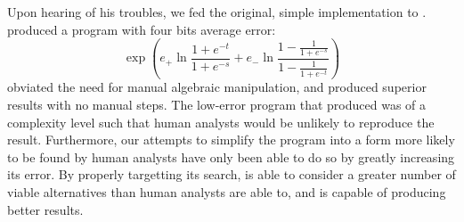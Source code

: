 \documentclass[paper.tex]{subfiles}
\begin{document}
Upon hearing of his troubles, we fed the original, simple
implementation to \casio.  \casio produced a program with four bits
average error:
\begin{equation*}
  \operatorname{exp}\left(e_+\ln{\frac{1+e^{-t}}{1+e^{-s}}} +
     e_-\ln{\frac{1-\frac{1}{1+e^{-s}}}
                 {1-\frac{1}{1+e^{-t}}}}\right)
\end{equation*}
\casio obviated the need for manual algebraic manipulation, and
produced superior results with no manual steps.  The low-error program
that \casio produced was of a complexity level such that human
analysts would be unlikely to reproduce the result.  Furthermore, our
attempts to simplify the program into a form more likely to be found
by human analysts have only been able to do so by greatly increasing
its error.  By properly targetting its search, \casio is able to
consider a greater number of viable alternatives than human analysts
are able to, and is capable of producing better results.
\end{document}
